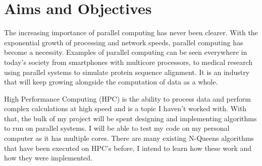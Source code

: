     
\section{Aims and Objectives}                                                           \label{sec:intro_aims} 
The increasing importance of parallel computing has never been clearer. With the exponential growth of processing and network speeds, parallel computing has become a necessity. Examples of parallel computing can be seen everywhere in today’s society from smartphones with multicore processors, to medical research using parallel systems to simulate protein sequence alignment\cite{li2003clustalw}. It is an industry that will keep growing alongside the computation of data as a whole. 
        
High Performance Computing (HPC) is the ability to process data and perform complex calculations at high speed and is a topic I haven't worked with. With that, the bulk of my project will be spent designing and implementing algorithms to run on parallel systems. I will be able to test my code on my personal computer as it has multiple cores. There are many existing N-Queens algorithms that have been executed on HPC's before, I intend to learn how these work and how they were implemented. 
        
